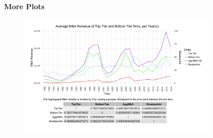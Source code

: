 \documentclass{article}
\begin{document}
\newpage
{\large \textbf{More Plots} }
\begin{figure}[H]\centering
\includegraphics[width=0.85\textwidth]{../IndivTexOutput/MnADifferences.jpg}\end{figure}

\newpage
\end{document}
